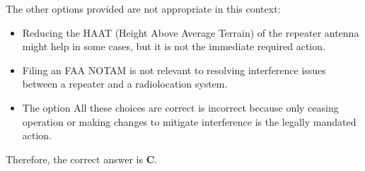 The other options provided are not appropriate in this context:
\begin{itemize}
    \item Reducing the HAAT (Height Above Average Terrain) of the repeater antenna might help in some cases, but it is not the immediate required action.
    \item Filing an FAA NOTAM is not relevant to resolving interference issues between a repeater and a radiolocation system.
    \item The option All these choices are correct is incorrect because only ceasing operation or making changes to mitigate interference is the legally mandated action.
\end{itemize}

Therefore, the correct answer is \textbf{C}.

